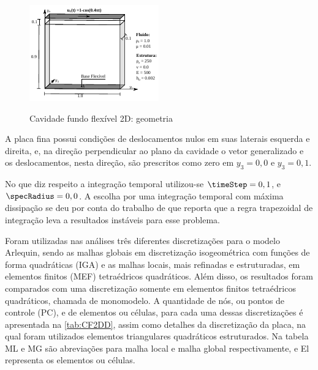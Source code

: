 \begin{figure}[!htbp]
	\caption{Cavidade fundo flexível 2D: geometria}
	\centering 
	\includegraphics[scale=2.5,trim=0cm 0cm 0cm 0cm, clip=true]{Imagens/Cap7/cavFF2d_geometria.pdf}	
	\label{fig:cavFF2d_geometria}
\end{figure}

A placa fina possui condições de deslocamentos nulos em suas laterais esquerda e direita, e, na direção perpendicular ao plano da cavidade o vetor generalizado e os deslocamentos, nesta direção, são prescritos como zero em $y_3=0,0$ e $y_3=0,1$.

No que diz respeito a integração temporal utilizou-se $\timeStep = 0,1$, e $\specRadius = 0,0$. A escolha por uma integração temporal com máxima dissipação se deu por conta do trabalho de  que reporta que a regra trapezoidal de integração leva a resultados instáveis para esse problema.

Foram utilizadas nas análises três diferentes discretizações para o modelo Arlequin, sendo as malhas globais em discretização isogeométrica com funções de forma quadráticas (IGA) e as malhas locais, mais refinadas e estruturadas, em elementos finitos (MEF) tetraédricos quadráticos. Além disso, os resultados foram comparados com uma discretização somente em elementos finitos tetraédricos quadráticos, chamada de monomodelo. A quantidade de nós, ou pontos de controle (PC), e de elementos ou células, para cada uma dessas discretizações é apresentada na \autoref{tab:CF2DD}, assim como detalhes da discretização da placa, na qual foram utilizados elementos triangulares quadráticos estruturados. Na tabela ML e MG são abreviações para malha local e malha global respectivamente, e El representa os elementos ou células.
	

